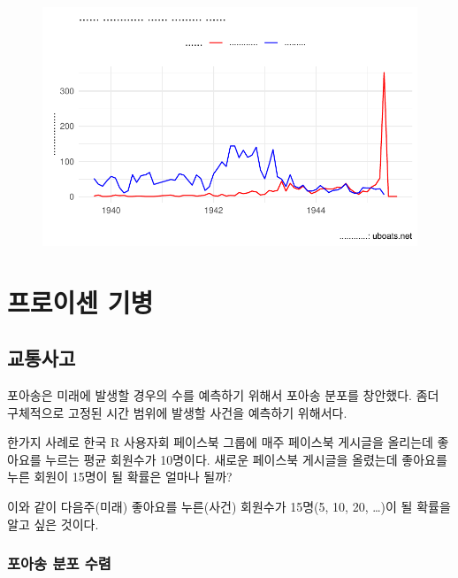 \documentclass[
  letterpaper,
  chapter,a4paper,showtrims,openright,hidelinks]{oblivoir}
\begin{document}
\begin{figure}[H]

{\centering \includegraphics{u_boats_files/figure-pdf/unnamed-chunk-10-1.pdf}

}

\end{figure}

\hypertarget{uxd504uxb85cuxc774uxc13c-uxae30uxbcd1}{%
\chapter{프로이센 기병}\label{uxd504uxb85cuxc774uxc13c-uxae30uxbcd1}}

\hypertarget{uxad50uxd1b5uxc0acuxace0}{%
\section{교통사고}\label{uxad50uxd1b5uxc0acuxace0}}

포아송은 미래에 발생할 경우의 수를 예측하기 위해서 포아송 분포를
창안했다. 좀더 구체적으로 고정된 시간 범위에 발생할 사건을 예측하기
위해서다.

한가지 사례로 한국 R 사용자회 페이스북 그룹에 매주 페이스북 게시글을
올리는데 좋아요를 누르는 평균 회원수가 10명이다. 새로운 페이스북
게시글을 올렸는데 좋아요를 누른 회원이 15명이 될 확률은 얼마나 될까?

이와 같이 다음주(미래) 좋아요를 누른(사건) 회원수가 15명(5, 10, 20,
\ldots)이 될 확률을 알고 싶은 것이다.

\hypertarget{uxd3ecuxc544uxc1a1-uxbd84uxd3ec-uxc218uxb834}{%
\subsection{포아송 분포
수렴}\label{uxd3ecuxc544uxc1a1-uxbd84uxd3ec-uxc218uxb834}}
\end{document}
